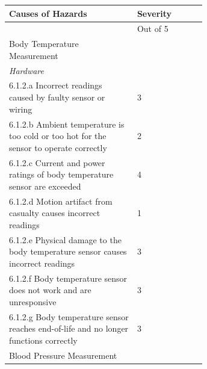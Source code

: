 \documentclass{article}
\begin{document}
\begin{longtable}{|p{0.65\linewidth}|l|}
\hline
\textbf{Causes of Hazards}                               & \textbf{Severity}   \\
\endhead
%
                       & Out of 5   \\
\hline
\rowcolor{Gray}
Body Temperature Measurement                                       &                     \\
\hline
\textit{Hardware}                                                  &                     \\
\hline
6.1.2.a Incorrect readings caused by faulty sensor or wiring                                                                                                       & 3                   \\
\hline
6.1.2.b Ambient temperature is too cold or too hot for the sensor to operate correctly                                                                             & 2                   \\
\hline
6.1.2.c Current and power ratings of body temperature sensor are exceeded                                                                                          & 4                   \\
\hline
6.1.2.d Motion artifact from casualty causes incorrect readings                                                                                                    & 1                   \\
\hline
6.1.2.e Physical damage to the body temperature sensor causes incorrect readings                                                                                   & 3                   \\
\hline
6.1.2.f Body temperature sensor does not work and are unresponsive                                                                                                 & 3                   \\
\hline
6.1.2.g Body temperature sensor reaches end-of-life and no longer functions correctly                                                                              & 3                   \\
\hline 
\rowcolor{Gray}
Blood Pressure Measurement                                         &                     \\

\end{longtable}
\end{document}
